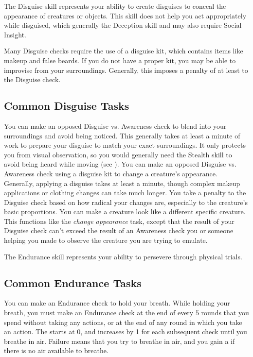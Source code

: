 \newpage
{}
    The Disguise skill represents your ability to create disguises to conceal the appearance of creatures or objects.
    This skill does not help you act appropriately while disguised, which generally the Deception skill and may also require Social Insight.

    Many Disguise checks require the use of a disguise kit, which contains items like makeup and false beards.
    If you do not have a proper kit, you may be able to improvise from your surroundings.
    Generally, this imposes a penalty of at least  to the Disguise check.

    \subsection{Common Disguise Tasks}
         You can make an opposed Disguise vs. Awareness check to blend into your surroundings and avoid being noticed.
        This generally takes at least a minute of work to prepare your disguise to match your exact surroundings.
        It only protects you from visual observation, so you would generally need the Stealth skill to avoid being heard while moving (see ).
        \label{Change Appearance} 
        You can make an opposed Disguise vs. Awareness check using a disguise kit to change a creature's appearance.
        Generally, applying a disguise takes at least a minute, though complex makeup applications or clothing changes can take much longer.
        You take a penalty to the Disguise check based on how radical your changes are, especially to the creature's basic proportions.
         You can make a creature look like a different specific creature.
         This functions like the \textit{change appearance} task, except that the result of your Disguise check can't exceed the result of an Awareness check you or someone helping you made to observe the creature you are trying to emulate.

\newpage
{}
    The Endurance skill represents your ability to persevere through physical trials.

    \subsection{Common Endurance Tasks}
        \label{Hold Breath}
        You can make an Endurance check to hold your breath.
        While holding your breath, you must make an Endurance check at the end of every 5 rounds that you spend without taking any actions, or at the end of any round in which you take an action.
        The  starts at 0, and increases by 1 for each subsequent check until you breathe in air.
        Failure means that you try to breathe in air, and you gain a  if there is no air available to breathe.

